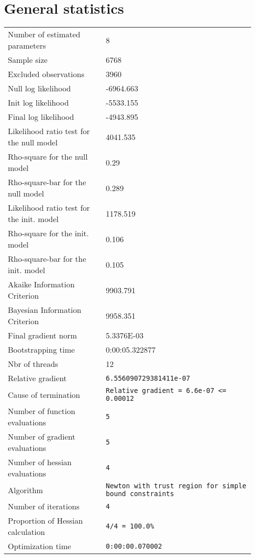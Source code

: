 \section{General statistics}
\begin{tabular}{ll}
Number of estimated parameters & 8 \\
Sample size & 6768 \\
Excluded observations & 3960 \\
Null log likelihood & -6964.663 \\
Init log likelihood & -5533.155 \\
Final log likelihood & -4943.895 \\
Likelihood ratio test for the null model & 4041.535 \\
Rho-square for the null model & 0.29 \\
Rho-square-bar for the null model & 0.289 \\
Likelihood ratio test for the init. model & 1178.519 \\
Rho-square for the init. model & 0.106 \\
Rho-square-bar for the init. model & 0.105 \\
Akaike Information Criterion & 9903.791 \\
Bayesian Information Criterion & 9958.351 \\
Final gradient norm & 5.3376E-03 \\
Bootstrapping time & 0:00:05.322877 \\
Nbr of threads & 12 \\
Relative gradient & \verb$6.556090729381411e-07$ \\
Cause of termination & \verb$Relative gradient = 6.6e-07 <= 0.00012$ \\
Number of function evaluations & \verb$5$ \\
Number of gradient evaluations & \verb$5$ \\
Number of hessian evaluations & \verb$4$ \\
Algorithm & \verb$Newton with trust region for simple bound constraints$ \\
Number of iterations & \verb$4$ \\
Proportion of Hessian calculation & \verb$4/4 = 100.0%$ \\
Optimization time & \verb$0:00:00.070002$ \\
\end{tabular}


